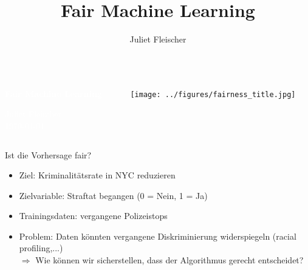 \documentclass[aspectratio=169]{beamer}
\title{Fair Machine Learning}
\author{Juliet Fleischer} %
\institute[LMU]{LMU} %
{

}
\begin{document}
{
\begin{frame}
\begin{columns}
	\begin{column}{0.4\textwidth}
		\vspace{2.5cm}
		
		\textbf{\textcolor{white}{\Large Fair Machine Learning}}
		\vspace{1cm}
		
		\textcolor{white}{\footnotesize Juliet Fleischer \\
			\today}
	\end{column}
	\begin{column}{0.49\textwidth}
		\vspace{3cm}
		\begin{center}
			\texttt{[image: ../figures/fairness\_title.jpg]}
		\end{center}
	\end{column}
\end{columns}
\end{frame}
}





\begin{frame}{Ist die Vorhersage fair?}
    \begin{itemize}
		\item<1-> Ziel: Kriminalitätsrate in NYC reduzieren
		\item<2-> Zielvariable: Straftat begangen  (0 = Nein, 1 = Ja)
        \item<3-> Trainingsdaten: vergangene Polizeistops
        \item<4-> Problem: Daten könnten vergangene Diskriminierung widerspiegeln (racial profiling,...) \\
		\onslide<5->$\Rightarrow$ Wie können wir sicherstellen, dass der Algorithmus gerecht entscheidet?
    \end{itemize}
\end{frame}
\end{document}
